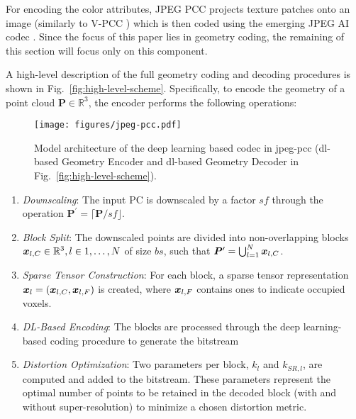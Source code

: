 For encoding the color attributes, JPEG
PCC projects texture patches onto an image (similarly to V-PCC \cite{V-PCC}) which is then coded using the emerging JPEG AI codec \cite{jpeg-ai}.
Since the focus of this paper lies in geometry coding, the remaining of this section will focus only on this component.

A high-level description of the full geometry coding and decoding procedures is shown in Fig.~\ref{fig:high-level-scheme}. Specifically, to encode the geometry of a point cloud $\bm{P} \in \mathbb{R}^3$, the encoder performs the following operations:


\begin{figure*}
    \centering
    \texttt{[image: figures/jpeg-pcc.pdf]}
    \caption{Model architecture of the deep learning based codec in \gls{jpeg-pcc} (\gls{dl}-based Geometry Encoder and \gls{dl}-based Geometry Decoder in Fig.~\ref{fig:high-level-scheme}).}
    \label{fig:dl-scheme}
\end{figure*}

\begin{enumerate}[label=E\arabic*.]
    \item \textit{Downscaling}: The input PC is downscaled by a factor $sf$ through the operation $\boldsymbol{P}^\prime = \lceil \boldsymbol{P}/sf \rfloor$.
    \item \textit{Block Split}: The downscaled points are divided into non-overlapping blocks $\x_{l, C} \in \mathbb{R}^3, l \in {1, \dots, N}$ of size $bs$, such that $\boldsymbol{P}^\prime = \bigcup_{l=1}^{N} \x_{l, C}$.
    \item \textit{Sparse Tensor Construction}: For each block, a sparse tensor representation $\x_l = (\x_{l, C}, \x_{l, F})$ is created, where $\x_{l, F}$ contains ones to indicate occupied voxels.
    \item \textit{DL-Based Encoding}: The blocks are processed through the deep learning-based coding procedure to generate the bitstream
    \item \textit{Distortion Optimization}: Two parameters per block, $k_l$ and $k_{SR, l}$, are computed and added to the bitstream. These parameters represent the optimal number of points to be retained in the decoded block (with and without super-resolution) to minimize a chosen distortion metric.
\end{enumerate}


